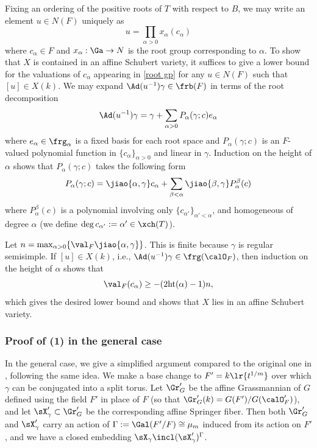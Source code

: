 Fixing an ordering of the positive roots of $T$ with respect to $B$, we may write an element  $u\in N(F)$ uniquely as
\begin{equation}\label{root gp}
u=\prod_{\alpha>0}x_{\alpha}(c_{\alpha})
\end{equation}
where $c_{\alpha}\in F$ and $x_{\alpha}: \Ga\to N$ is the root group corresponding to $\alpha$. To show that $X$ is contained in an affine Schubert variety, it suffices to give a lower bound for the valuations of $c_{\alpha}$ appearing in \eqref{root gp} for any $u\in N(F)$ such that $[u]\in X(k)$. We may expand $\Ad(u^{-1})\gamma\in\frb(F)$ in terms of the root decomposition
\begin{equation*}
\Ad(u^{-1})\gamma=\gamma+\sum_{\alpha>0}P_{\alpha}(\gamma; c)e_{\alpha}
\end{equation*} 
where $e_{\alpha}\in\frg_{\alpha}$ is a fixed basis for each root space and $P_{\alpha}(\gamma;c)$ is an $F$-valued polynomial function in $\{c_{\alpha}\}_{\alpha>0}$ and linear in $\gamma$. Induction on the height of $\alpha$ shows that $P_{\alpha}(\gamma;c)$ takes the following form
\begin{equation}\label{conj u gamma}
P_{\alpha}(\gamma;c)=\jiao{\alpha,\gamma}c_{\alpha}+\sum_{\beta<\alpha}\jiao{\beta,\gamma}P^{\beta}_{\alpha}(c)
\end{equation}
where $P^{\beta}_{\alpha}(c)$ is a polynomial involving only $\{c_{\alpha'}\}_{\alpha'<\alpha}$, and homogeneous of degree $\alpha$ (we define $\deg c_{\alpha'}:=\alpha'\in\xch(T)$). 

Let $n=\max_{\alpha>0}\{\val_{F}\jiao{\alpha,\gamma}\}$. This is finite because $\gamma$  is regular semisimple. If $[u]\in X(k)$, i.e., $\Ad(u^{-1})\gamma\in\frg(\calO_{F})$, then induction on the height of $\alpha$ shows that
\begin{equation*}
\val_{F}(c_{\alpha})\geq -(2\textup{ht}(\alpha)-1)n,
\end{equation*} 
which gives the desired lower bound and shows that $X$ lies in an affine Schubert variety.

\subsubsection{Proof of (1) in the general case} In the general case, we give a simplified argument compared to the original one in \cite{KL}, following the same idea. We make a base change to $F'=k\lr{t^{1/m}}$ over which $\gamma$ can be conjugated into a split torus. Let $\Gr'_{G}$ be the affine Grassmannian of $G$ defined using the field $F'$ in place of $F$ (so that $\Gr'_{G}(k)=G(F')/G(\calO'_{F})$), and let $\sX'_{\gamma}\subset\Gr'_{G}$ be the corresponding affine Springer fiber. Then both $\Gr'_{G}$ and $\sX'_{\gamma}$ carry an action of $\Gamma:=\Gal(F'/F)\cong\mu_{m}$ induced from its action on $F'$, and we have a closed embedding $\sX_{\gamma}\incl (\sX'_{\gamma})^{\Gamma}$. 

